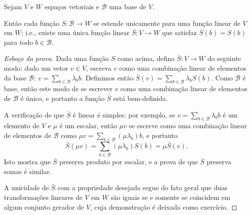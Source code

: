 \begin{theorem}
	Sejam $V$ e $W$ espaços vetoriais e $\mathcal{B}$ uma base de $V$.
	
	Então cada função $S\colon\mathcal{B}\to W$ se estende unicamente para uma função linear de $V$ em $W$; i.e., existe uma única função linear $\bar{S}\colon V\to W$ que satisfaz $\bar{S}(b)=S(b)$ para todo $b\in\mathcal{B}$.
\end{theorem}

\begin{proof}[Esboço da prova]
	Dada uma função $S$ como acima, defina $\bar{S}\colon V\to W$ do seguinte modo: dado um vetor $v\in V$, escreva $v$ como uma combinação linear de elementos da base $\mathcal{B}$: $v=\sum_{b\in\mathcal{B}}\lambda_b b$. Definimos então $\bar{S}(v)=\sum_{b\in\mathcal{B}}\lambda_b S(b)$. Como $\mathcal{B}$ é base, então este modo de se escrever $v$ como uma combinação linear de elementos de $\mathcal{B}$ é único, e portanto a função $\bar{S}$ está bem-definida.
	
	A verificação de que $\bar{S}$ é linear é simples: por exemplo, se $v=\sum_{b\in\mathcal{B}}\lambda_b b$ é um elemento de $V$ e $\mu$ é um escalar, então $\mu v$ se escreve como uma combinação linear de elementos de $\mathcal{B}$ como $\mu v=\sum_{b\in\mathcal{B}}(\mu\lambda_b)b$, e portanto
	\[\bar{S}(\mu v)=\sum_{b\in\mathcal{B}}(\mu\lambda_b)S(b)=\mu\bar{S}(v).\]
	Isto mostra que $\bar{S}$ preserva produto por escalar, e a prova de que $\bar{S}$ preserva somas é similar.
	
	A unicidade de $\bar{S}$ com a propriedade desejada segue do fato geral que duas transformações lineares de $V$ em $W$ são iguais se e somente se coincidem em algum conjunto gerador de $V$, cuja demonstração é deixada como exercício.
\end{proof}